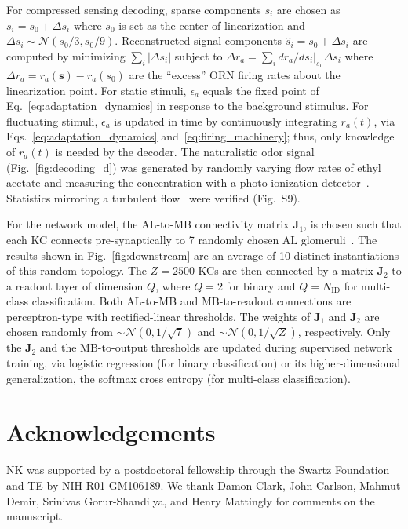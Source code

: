\documentclass[10pt,prl,aps,showpacs,twocolumn,unsortedaddress]{revtex4-1}
\begin{document}
For compressed sensing decoding, sparse components $s_i$ are chosen as $s_i = s_0 + \Delta s_i$ where $s_0$ is set as the center of linearization and $\Delta s_i \sim \mathcal {N} (s_0/3, s_0/9)$. Reconstructed signal components $\hat {s} _i = s_0 + \Delta s_i$ are computed by minimizing $\sum_i |\Delta s_i|$ subject to $\Delta r_a = \sum_i dr_a/ds_i\big|_{s_0}\Delta  s_i$ where $\Delta r_a = r_a(\mathbf s) -  r_a(s_0)$ are the ``excess” ORN firing rates about the linearization point. For static stimuli, $\epsilon_a$ equals the fixed point of Eq.~\ref{eq:adaptation_dynamics} in response to the background stimulus. For fluctuating stimuli, $\epsilon_a$ is updated in time by continuously integrating  $r_a(t)$, via Eqs.~\ref{eq:adaptation_dynamics} and~\ref{eq:firing_machinery}; thus, only knowledge of $r_a(t)$ is needed by the decoder.
The naturalistic odor signal (Fig.~\ref{fig:decoding_d}) was generated by randomly varying flow rates of ethyl acetate and measuring the concentration with a photo-ionization detector~\cite{srinivas_elife}. Statistics mirroring a turbulent flow~\cite{celani} were verified (Fig.~S9).

For the network model, the AL-to-MB connectivity matrix $\mathbf {J}_1$, is chosen such that  each KC connects pre-synaptically to 7 randomly chosen AL glomeruli~\cite{litwinkumar,abbott_axel}. The results shown in Fig.~\ref{fig:downstream} are an average of 10 distinct instantiations of this random topology. The $Z=2500$ KCs are then connected by a matrix $\mathbf J_2$ to a readout layer of dimension $Q$, where $Q=2$ for binary and $Q=N_{\text{ID}}$ for multi-class classification. Both AL-to-MB and MB-to-readout connections are perceptron-type with rectified-linear thresholds. The weights of $\mathbf J_1$ and $\mathbf J_2$ are chosen randomly from $\sim \mathcal{N}(0, 1/\sqrt{7})$ and $\sim \mathcal{N}(0, 1/\sqrt{Z})$, respectively. Only the $\mathbf J_2$ and the MB-to-output thresholds are updated during supervised network training, via logistic regression (for binary classification) or its higher-dimensional generalization, the softmax cross entropy (for multi-class classification).

\section*{Acknowledgements}

NK was supported by a postdoctoral fellowship through the Swartz Foundation and TE by NIH R01 GM106189. We thank Damon  Clark, John Carlson, Mahmut Demir, Srinivas Gorur-Shandilya, and Henry Mattingly for comments on the manuscript.




\end{document}
